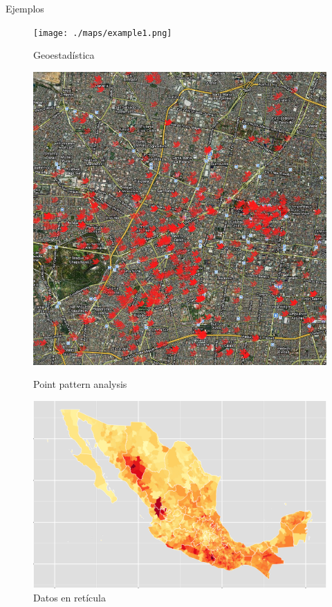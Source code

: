 \documentclass{beamer}
\begin{document}
\begin{frame}{Ejemplos}
\begin{figure}[!htb]
  \texttt{[image: ./maps/example1.png]}
  \caption{Geoestadística}\label{fig:awesome_image1}
\endminipage\hfill
{}
  \includegraphics[width=\linewidth]{./maps/example2.jpg}
  \caption{Point pattern analysis}\label{fig:awesome_image2}
\endminipage\hfill
{}%
  \includegraphics[width=\linewidth]{./maps/example3.png}
  \caption{Datos en retícula}\label{fig:awesome_image3}
\endminipage
\end{figure}
\end{frame}
\end{document}
